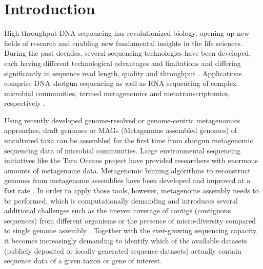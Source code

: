 \documentclass{bioinfo}
\begin{document}
\maketitle

\section{Introduction}
High-throughput DNA sequencing has revolutionized biology, opening up new fields of research and enabling new fundamental insights in the life sciences. During the past decades, several sequencing technologies have been developed, each having different technological advantages and limitations and differing significantly in sequence read length, quality and throughput \citep{Mardis2017}. Applications comprise DNA shotgun sequencing as well as RNA sequencing of complex microbial communities, termed metagenomics and metatranscriptomics, respectively \citep{Mitchell2018}. 

Using recently developed genome-resolved or genome-centric metagenomics approaches, draft genomes or MAGs (Metagenome assembled genomes) of uncultured taxa can be assembled for the first time from shotgun metagenomic sequencing data of microbial communities. Large environmental sequencing initiatives like the Tara Oceans project \citep{Sunagawa2015} have provided researchers with enormous amounts of metagenome data. Metagenomic binning algorithms to reconstruct genomes from metagenome assemblies have been developed and improved at a fast rate \citep{Alneberg2014,Eren2015}. In order to apply those tools, however, metagenome assembly needs to be performed, which is computationally demanding and introduces several additional challenges such as the uneven coverage of contigs (contiguous sequences) from different organisms or the presence of micro-diversity compared to single genome assembly \citep{Quince2017}. Together with the ever-growing sequencing capacity, it becomes increasingly demanding to identify which of the available datasets (publicly deposited or locally generated sequence datasets) actually contain sequence data of a given taxon or gene of interest.
\end{document}
